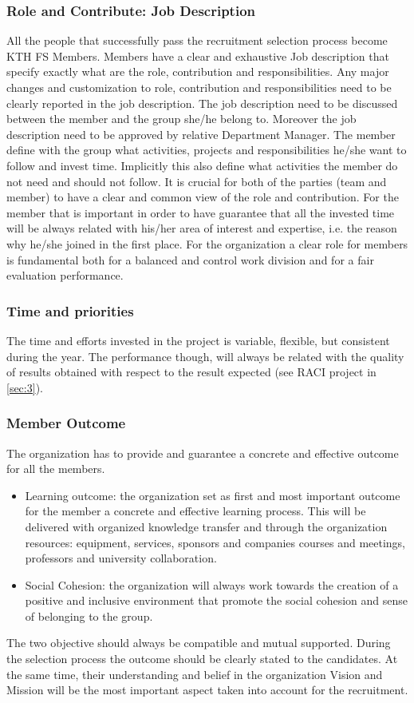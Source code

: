 \documentclass[graybox]{svmult}
\begin{document}
\subsubsection{Role and Contribute: Job Description}
All the people that successfully pass the recruitment selection process become KTH FS Members.
Members have a clear and exhaustive Job description that specify exactly what are the role, contribution and responsibilities.
Any major changes and customization to role, contribution and responsibilities need to be clearly reported in the job description.
The job description need to be discussed between the member and the group she/he belong to. Moreover the job description need to be approved by relative Department Manager.
The member define with the group what activities, projects and responsibilities he/she want to follow and invest time. Implicitly this also define what activities the member do not need and should not follow. It is crucial for both of the parties (team and member) to have a clear and common view of the role and contribution. For the member that is important in order to have guarantee that all the invested time will be always related with his/her area of interest and expertise, i.e. the reason why he/she joined in the first place.
For the organization a clear role for members is fundamental both for a balanced and control work division and for a fair evaluation performance.
\subsubsection{Time and priorities}
The time and efforts invested in the project is variable, flexible, but consistent during the year. The performance though, will always be related with the quality of results obtained with respect to the result expected (see RACI project in \ref{sec:3}). 
\subsubsection{Member Outcome}
The organization has to provide and guarantee a concrete and effective outcome for all the members.
\begin{itemize}
    \item Learning outcome: the organization set as first and most important outcome for the member a concrete and effective learning process. This will be delivered with organized knowledge transfer and through the organization resources: equipment, services, sponsors and companies courses and meetings, professors and university collaboration.
    \item Social Cohesion: the organization will always work towards the creation of a positive and inclusive environment that promote the social cohesion and sense of belonging to the group.
\end{itemize}
The two objective should always be compatible and mutual supported.
During the selection process the outcome should be clearly stated to the candidates. At the same time, their understanding and belief in the organization Vision and Mission will be the most important aspect taken into account for the recruitment.
\end{document}
